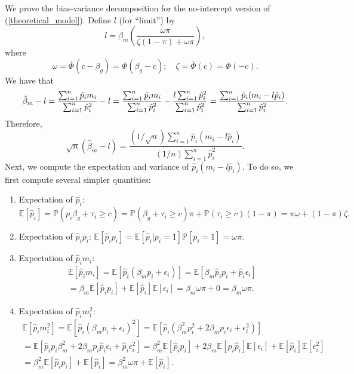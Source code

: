 \documentclass[12pt]{article}
\begin{document}
\begin{appendices}
\begin{refsection}
		We prove the bias-variance decomposition for the no-intercept version of (\ref{theoretical_model}). Define $l$ (for ``limit'') by
		$$l = \beta_m \left(\frac{\omega \pi}{\zeta(1-\pi) + \omega \pi}\right),$$ where
		$$
		\omega = \bar{\Phi}(c - \beta_g) = \Phi(\beta_g - c); \quad
		\zeta = \bar{\Phi}(c) = \Phi(-c).
		$$
		We have that
		\begin{equation*}
		\hat{\beta}_m - l = \frac{\sum_{i=1}^n \hat{p}_i m_i}{ \sum_{i=1}^n \hat{p}^2_i} - l = \frac{\sum_{i=1}^n \hat{p}_i m_i}{ \sum_{i=1}^n \hat{p}^2_i} - \frac{l \sum_{i=1}^n \hat{p}_i^2 }{ \sum_{i=1}^n \hat{p}_i^2} \\ = \frac{\sum_{i=1}^n \hat{p}_i(m_i - l \hat{p}_i)}{ \sum_{i=1}^n \hat{p}_i^2}.
		\end{equation*}
		Therefore,
		\begin{equation}\label{bc_decomp_1}
		\sqrt{n}(\hat{\beta}_m - l) = \frac{(1/\sqrt{n})\sum_{i=1}^n \hat{p}_i(m_i - l \hat{p}_i)}{(1/n)\sum_{i=1}^n \hat{p}_i^2}.
		\end{equation}
		Next, we compute the expectation and variance of $\hat{p}_i(m_i - l\hat{p}_i)$. To do so, we first compute several simpler quantities:
		\begin{enumerate}
			\item Expectation of $\hat{p}_i$: $
			\mathbb{E}[\hat{p}_i] = \mathbb{P}(p_i\beta_g + \tau_i \geq c) =  \mathbb{P}(\beta_g + \tau_i \geq c)\pi + \mathbb{P}(\tau_i \geq c)(1-\pi) = \pi \omega + (1-\pi)\zeta.$
			
			\item Expectation of $\hat{p}_i p_i$: $\mathbb{E}\left[\hat{p}_i p_i\right] = \mathbb{E}\left[\hat{p}_i | p_i = 1 \right]\mathbb{P}\left[p_i = 1\right] = \omega \pi.$
			\item Expectation of $\hat{p}_i m_i$:
			\begin{multline*}
			\mathbb{E}[\hat{p}_i m_i] = \mathbb{E}\left[\hat{p}_i(\beta_m p_i + \epsilon_i)\right] = \mathbb{E}\left[\beta_m \hat{p}_i p_i + \hat{p}_i \epsilon_i \right] \\ = \beta_m \mathbb{E}\left[ \hat{p}_i p_i \right] + \mathbb{E}[\hat{p}_i]\mathbb{E}[\epsilon_i] = \beta_m \omega \pi + 0 = \beta_m \omega \pi.
			\end{multline*}
			\item Expectation of $\hat{p}_i m_i^2$: \begin{multline*}
			\mathbb{E}\left[\hat{p}_i m_i^2\right] = \mathbb{E} \left[ \hat{p}_i( \beta_m p_i + \epsilon_i )^2 \right] = \mathbb{E}\left[ \hat{p}_i \left( \beta_m^2 p_i^2 + 2 \beta_m p_i \epsilon_i + \epsilon_i^2 \right)  \right] \\ = \mathbb{E}\left[ \hat{p}_i p_i \beta^2_m + 2 \beta_m p_i \hat{p}_i \epsilon_i + \hat{p}_i \epsilon_i^2 \right] = \beta^2_m \mathbb{E}[ \hat{p}_i p_i] + 2 \beta_m \mathbb{E}[p_i\hat{p}_i] \mathbb{E}[\epsilon_i] + \mathbb{E}[\hat{p}_i] \mathbb{E}[ \epsilon^2_i ] \\ = \beta^2_m \mathbb{E}[ \hat{p}_i p_i] + \mathbb{E}[\hat{p}_i] = \beta^2_m \omega \pi + \mathbb{E}[ \hat{p}_i]. 
			\end{multline*}
		\end{enumerate}
		

\end{refsection}
\end{appendices}
\end{document}
